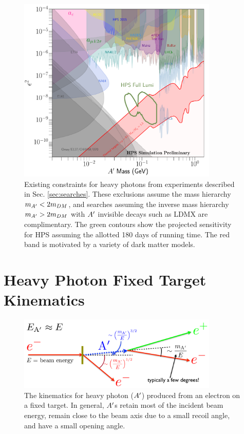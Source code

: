 
\begin{figure}
    \centering
    \includegraphics[width=0.85\textwidth]{figs/upgrades/reach_full_lumi.pdf}
    \caption{Existing constraints for heavy photons from experiments described in Sec. \ref{sec:searches}. These exclusions assume the mass hierarchy $m_{A^\prime}<2m_{DM}$, and searches assuming the inverse mass hierarchy $m_{A^\prime}>2m_{DM}$ with $A^\prime$ invisible decays such as LDMX are complimentary. The green contours show the projected sensitivity for HPS assuming the allotted 180 days of running time. The red band is motivated by a variety of dark matter models.}
    \label{fig:parameterspace}
\end{figure}

\clearpage

\section{Heavy Photon Fixed Target Kinematics}\label{sec:kin}

 \begin{figure}
    \centering
    \includegraphics[width=0.85\textwidth]{figs/motivation/ap_kinematics.png}
    \caption{The kinematics for heavy photon ($A^\prime$) produced from an electron on a fixed target. In general, $A^\prime$s retain most of the incident beam energy, remain close to the beam axis due to a small recoil angle, and have a small opening angle.}
    \label{fig:kinematics}
\end{figure}

